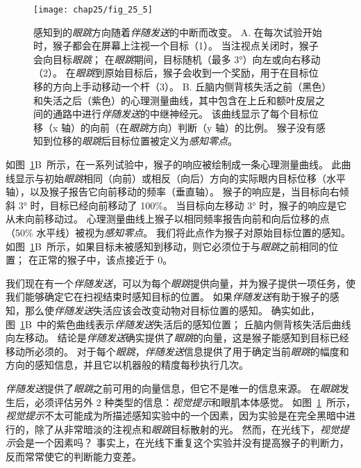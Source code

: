 \begin{figure}[htbp]
	\centering
	\texttt{[image: chap25/fig\_25\_5]}
	\caption{感知到的\textit{眼跳}方向随着\textit{伴随发送}的中断而改变。
		A. 在每次试验开始时，猴子都会在屏幕上注视一个目标（1）。
		当注视点关闭时，猴子会向目标\textit{眼跳}；
		在\textit{眼跳}期间，目标随机（最多 3°）向左或向右移动（2）。
		在\textit{眼跳}到原始目标后，猴子会收到一个奖励，用于在目标位移的方向上手动移动一个杆（3）。
		B. 丘脑内侧背核失活之前（黑色）和失活之后（紫色）的心理测量曲线，其中包含在上丘和额叶皮层之间的通路中进行\textit{伴随发送}的中继神经元。
		该曲线显示了每个目标位移（x 轴）的向前（在\textit{眼跳}方向）判断（y 轴）的比例。
		猴子没有感知到位移的\textit{眼跳}后目标位置被定义为\textit{感知零点}\cite{cavanaugh2016saccadic}。}
	\label{fig:25_5}
\end{figure}


如图~\ref{fig:25_5}B~所示，在一系列试验中，猴子的响应被绘制成一条心理测量曲线。
此曲线显示与初始\textit{眼跳}相同（向前）或相反（向后）方向的实际眼内目标位移（水平轴），以及猴子报告它向前移动的频率（垂直轴）。
猴子的响应是，当目标向右倾斜 3° 时，目标已经向前移动了 100\%。
当目标向左移动 3° 时，猴子的响应是它从未向前移动过。
心理测量曲线上猴子以相同频率报告向前和向后位移的点（50\% 水平线）被视为\textit{感知零点}。
我们将此点作为猴子对原始目标位置的感知。
如图~\ref{fig:25_5}B~所示，如果目标未被感知到移动，则它必须位于与\textit{眼跳}之前相同的位置；
在正常的猴子中，该点接近于 0。


我们现在有一个\textit{伴随发送}，可以为每个\textit{眼跳}提供向量，并为猴子提供一项任务，使我们能够确定它在扫视结束时感知目标的位置。
如果\textit{伴随发送}有助于猴子的感知，那么使\textit{伴随发送}失活应该会改变动物对目标位置的感知。
确实如此，图~\ref{fig:25_5}B~中的紫色曲线表示\textit{伴随发送}失活后的感知位置；
丘脑内侧背核失活后曲线向左移动。
结论是\textit{伴随发送}确实提供了\textit{眼跳}的向量，这是猴子能感知到目标已经移动所必须的。
对于每个\textit{眼跳}，\textit{伴随发送}信息提供了用于确定当前\textit{眼跳}的幅度和方向的感知信息，并且它以机器般的精度每秒执行几次。


\textit{伴随发送}提供了\textit{眼跳}之前可用的向量信息，但它不是唯一的信息来源。
在\textit{眼跳}发生后，必须评估另外 2 种类型的信息：\textit{视觉提示}和眼肌本体感觉。
如图~\ref{fig:25_5}~所示，\textit{视觉提示}不太可能成为所描述感知实验中的一个因素，因为实验是在完全黑暗中进行的，除了从非常暗淡的注视点和\textit{眼跳}目标散射的光。
然而，在光线下，\textit{视觉提示}会是一个因素吗？
事实上，在光线下重复这个实验并没有提高猴子的判断力，反而常常使它的判断能力变差。


